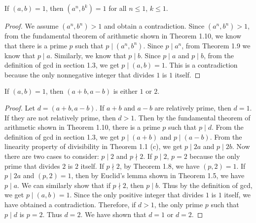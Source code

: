 \begin{exercise}{3}{}
  If \( (a, b) = 1 \), then \( (a^n, b^k) = 1 \) for all \( n \le 1
  \), \( k \le 1 \).
\end{exercise}

\begin{proof}
  We assume \( (a^n, b^n) > 1 \) and obtain a contradiction. Since \(
  (a^n, b^n) > 1 \), from the fundamental theorem of arithmetic shown
  in Theorem 1.10, we know that there is a prime \( p \) such that \(
  p \mid (a^n, b^n) \). Since \( p \mid a^n \), from Theorem 1.9 we
  know that \( p \mid a \). Similarly, we know that \( p \mid b \).
  Since \( p \mid a \) and \( p \mid b \), from the definition of gcd
  in section 1.3, we get \( p \mid (a, b) = 1 \). This is a
  contradiction because the only nonnegative integer that divides \( 1
  \) is \( 1 \) itself.
\end{proof}


\begin{exercise}{4}{}
  If \( (a, b) = 1 \), then \( (a + b, a - b) \) is either \( 1 \) or
  \( 2 \).
\end{exercise}

\begin{proof}
  Let \( d = (a + b, a - b) \). If \( a + b \) and \( a - b \) are
  relatively prime, then \( d = 1 \). If they are not relatively
  prime, then \( d > 1 \). Then by the fundamental theorem of
  arithmetic shown in Theorem 1.10, there is a prime \( p \) such that
  \( p \mid d \). From the definition of gcd in section 1.3, we get \(
  p \mid (a + b) \) and \( p \mid (a - b) \). From the linearity
  property of divisibility in Theorem 1.1 (c), we get \( p \mid 2a \)
  and \( p \mid 2b \). Now there are two cases to consider: \( p \mid
  2 \) and \( p \nmid 2 \). If \( p \mid 2 \), \( p = 2 \) because the
  only prime that divides \( 2 \) is \( 2 \) itself. If \( p \nmid 2
  \), by Theorem 1.8, we have \( (p, 2) = 1 \). If \( p \mid 2a \) and
  \( (p, 2) = 1 \), then by Euclid's lemma shown in Theorem 1.5, we
  have \( p \mid a \). We can similarly show that if \( p \nmid 2 \),
  then \( p \mid b \). Thus by the definition of gcd, we get \( p \mid
  (a, b) = 1 \). Since the only positive integer that divides \( 1 \)
  is \( 1 \) itself, we have obtained a contradiction. Therefore, if
  \( d > 1 \), the only prime \( p \) such that \( p \mid d \) is \( p
  = 2 \). Thus \( d = 2 \). We have shown that \( d = 1 \) or \( d = 2
  \).
\end{proof}

